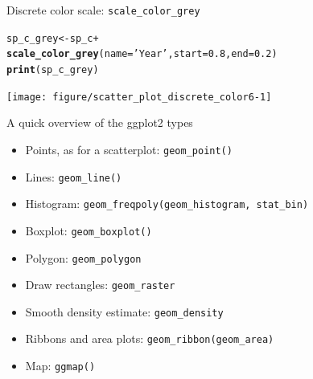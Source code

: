 \documentclass{beamer}\usepackage[]{graphicx}\usepackage[]{color}
\makeatletter
\newcommand{\hlnum}[1]{\textcolor[rgb]{0.686,0.059,0.569}{#1}}%
\newcommand{\hlstr}[1]{\textcolor[rgb]{0.192,0.494,0.8}{#1}}%
\newcommand{\hlopt}[1]{\textcolor[rgb]{0,0,0}{#1}}%
\newcommand{\hlstd}[1]{\textcolor[rgb]{0.345,0.345,0.345}{#1}}%
\newcommand{\hlkwb}[1]{\textcolor[rgb]{0.69,0.353,0.396}{#1}}%
\newcommand{\hlkwc}[1]{\textcolor[rgb]{0.333,0.667,0.333}{#1}}%
\newcommand{\hlkwd}[1]{\textcolor[rgb]{0.737,0.353,0.396}{\textbf{#1}}}%
\newenvironment{kframe}{%
 \def\at@end@of@kframe{}%
 \ifinner\ifhmode%
  \def\at@end@of@kframe{\end{minipage}}%
  \begin{minipage}{\columnwidth}%
 \fi\fi%
 \def\FrameCommand##1{\hskip\@totalleftmargin \hskip-\fboxsep
 \colorbox{shadecolor}{##1}\hskip-\fboxsep
     \hskip-\linewidth \hskip-\@totalleftmargin \hskip\columnwidth}%
 \MakeFramed {\advance\hsize-\width
   \@totalleftmargin\z@ \linewidth\hsize
   \@setminipage}}%
 {\par\unskip\endMakeFramed%
 \at@end@of@kframe}
\newenvironment{knitrout}{}{} %
\makeatother
\begin{document}
\begin{frame}[fragile]{Discrete color scale: \lstinline{scale_color_grey}}
\begin{knitrout}\footnotesize
{}\color{fgcolor}\begin{kframe}
\begin{alltt}
\hlstd{sp_c_grey} \hlkwb{<-} \hlstd{sp_c} \hlopt{+}
  \hlkwd{scale_color_grey}\hlstd{(}\hlkwc{name}\hlstd{=}\hlstr{'Year'}\hlstd{,} \hlkwc{start}\hlstd{=}\hlnum{0.8}\hlstd{,} \hlkwc{end}\hlstd{=}\hlnum{0.2}\hlstd{)}
\hlkwd{print}\hlstd{(sp_c_grey)}
\end{alltt}
\end{kframe}

{\centering \texttt{[image: figure/scatter\_plot\_discrete\_color6-1]} 

}



\end{knitrout}
\end{frame}

\begin{frame}[fragile]{A quick overview of the ggplot2 types}
\begin{itemize}
 \item Points, as for a scatterplot: \lstinline{geom_point()}
 \item Lines: \lstinline{geom_line()}
 \item Histogram: \lstinline{geom_freqpoly(geom_histogram, stat_bin)}
 \item Boxplot: \lstinline{geom_boxplot()}
 \item Polygon: \lstinline{geom_polygon}
 \item Draw rectangles: \lstinline{geom_raster}
 \item Smooth density estimate: \lstinline{geom_density}
 \item Ribbons and area plots: \lstinline{geom_ribbon(geom_area)}
 \item Map: \lstinline{ggmap()}
\end{itemize}
\end{frame}

\end{document}
